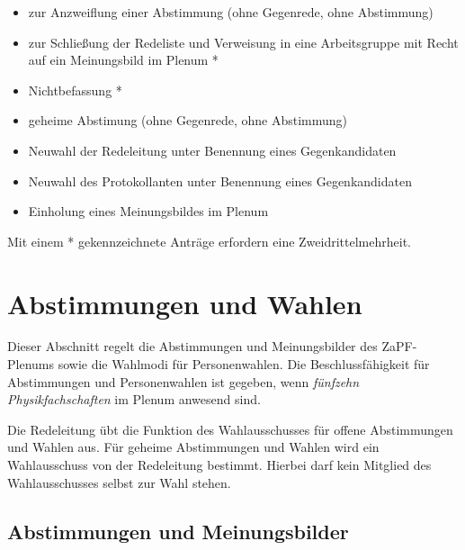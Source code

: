 \documentclass[draft,12pt,oneside]{scrreprt}
\begin{document}
\begin{enumerate}
\begin{itemize}
      \item zur Anzweiflung einer Abstimmung (ohne Gegenrede, ohne Abstimmung)

      \item zur Schließung der Redeliste und Verweisung in eine Arbeitsgruppe mit
            Recht auf ein Meinungsbild im Plenum *

      \item Nichtbefassung *

      \item geheime Abstimung (ohne Gegenrede, ohne Abstimmung)

      \item Neuwahl der Redeleitung unter Benennung eines Gegenkandidaten

      \item Neuwahl des Protokollanten unter Benennung eines Gegenkandidaten

      \item Einholung eines Meinungsbildes im Plenum
    \end{itemize}
    Mit einem * gekennzeichnete Anträge erfordern eine Zweidrittelmehrheit.
\end{enumerate}

\section{Abstimmungen und Wahlen}

Dieser Abschnitt regelt die Abstimmungen und Meinungsbilder des ZaPF-Plenums
sowie die Wahlmodi für Personenwahlen. Die Beschlussfähigkeit für Abstimmungen
und Personenwahlen ist gegeben, wenn \textit{fünfzehn Physikfachschaften}
im Plenum anwesend sind.

Die Redeleitung übt die Funktion des Wahlausschusses für offene Abstimmungen und
Wahlen aus. Für geheime Abstimmungen und Wahlen wird ein Wahlausschuss von der
Redeleitung bestimmt. Hierbei darf kein Mitglied des Wahlausschusses selbst zur
Wahl stehen.

\subsection{Abstimmungen und Meinungsbilder}
\end{document}
